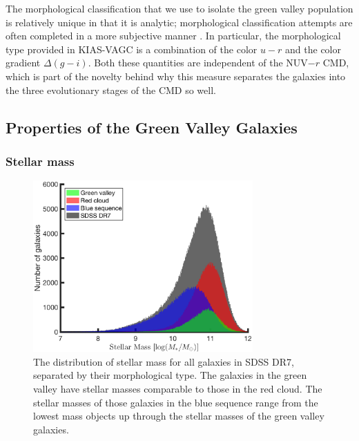 The morphological classification that we use to isolate the green valley 
population is relatively unique in that it is analytic; morphological 
classification attempts are often completed in a more subjective manner 
\citep[such as the GalaxyZoo,][]{Lintott11}.  In particular, the 
morphological type provided in KIAS-VAGC is a combination of the color $u-r$ and 
the color gradient $\Delta (g-i)$.  Both these quantities are independent of the 
NUV$-r$ CMD, which is part of the novelty behind why this measure separates the 
galaxies into the three evolutionary stages of the CMD so well.


\subsection{Properties of the Green Valley Galaxies}

\subsubsection{Stellar mass}

\begin{figure}
    \includegraphics[width=0.75\textwidth]{Images/GV/Mstar_hist}
    \caption[Stellar mass distribution by morphological type]{The distribution 
    of stellar mass for all galaxies in SDSS DR7, separated by their 
    morphological type.  The galaxies in the green valley have stellar masses 
    comparable to those in the red cloud.  The stellar masses of those galaxies 
    in the blue sequence range from the lowest mass objects up through the 
    stellar masses of the green valley galaxies.}
    \label{fig:M_hist}
\end{figure}


